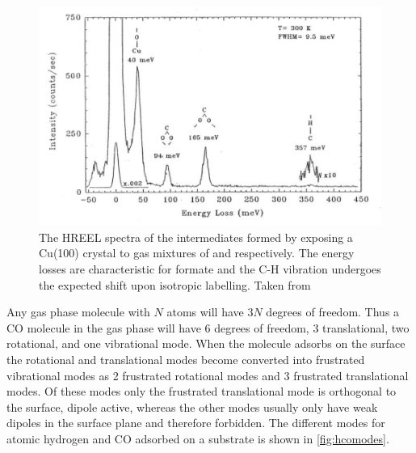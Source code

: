 \begin{figure}[h!]
	\begin{center}
	\includegraphics[scale=4]{figures/08_04.png}
	\caption{The HREEL spectra of the intermediates formed by exposing a Cu(100) crystal to gas mixtures of   and   respectively. The energy losses are characteristic for formate and the C-H vibration undergoes the expected shift upon isotropic labelling. Taken from \cite{Formate}}
	\label{fig:cuhreels}
	\end{center}
\end{figure}

Any gas phase molecule with $N$ atoms  will have $3N$ degrees of freedom. Thus a CO molecule in the gas phase will have 6 degrees of freedom, 3 translational, two rotational, and one vibrational mode. When the molecule adsorbs on the surface the rotational and translational modes become converted into frustrated vibrational modes as 2 frustrated rotational modes and 3 frustrated translational modes. Of these modes only the frustrated translational mode is orthogonal to the surface, dipole active, whereas the other modes usually only have weak dipoles in the surface plane and therefore forbidden. The different modes for atomic hydrogen and CO adsorbed on a substrate is shown in \autoref{fig:hcomodes}.

